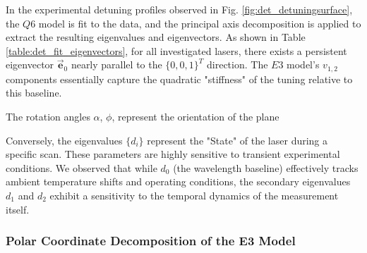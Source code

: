 \documentclass[8pt,a4paper]{report}
\begin{document}
	In the experimental detuning profiles observed in Fig. \ref{fig:det_detuningsurface}, the $Q6$ model is fit to the data, and the principal axis decomposition is applied to extract the resulting eigenvalues and eigenvectors. As shown in Table \ref{table:det_fit_eigenvectors}, for all investigated lasers, there exists a persistent eigenvector $\vec{\mathbf{e}}_0$ nearly parallel to the $\{0, 0, 1\}^T$ direction. The $E3$ model's $v_{1,2}$ components essentially capture the quadratic "stiffness" of the tuning relative to this baseline.
	
	
	
	The rotation angles $\alpha$, $\phi$, represent the orientation of the plane
	
	Conversely, the eigenvalues $\{d_i\}$ represent the "State" of the laser during a specific scan. These parameters are highly sensitive to transient experimental conditions. We observed that while $d_0$ (the wavelength baseline) effectively tracks ambient temperature shifts and operating conditions, the secondary eigenvalues $d_1$ and $d_2$ exhibit a sensitivity to the temporal dynamics of the measurement itself.
	
	\subsubsection{Polar Coordinate Decomposition of the E3 Model}
	
\end{document}
